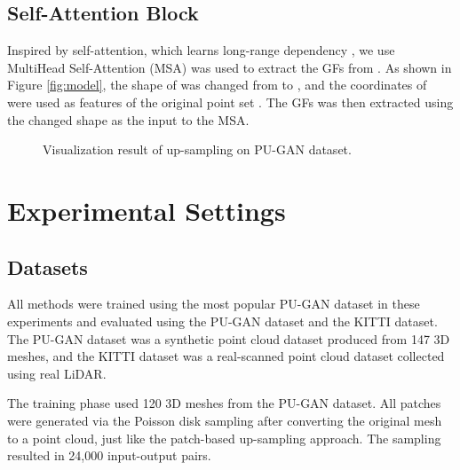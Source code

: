 \documentclass{article}
\begin{document}
\begin{center}

\end{center}

\subsection{Self-Attention Block} 
\label{sec:MHSA} 
\quad Inspired by self-attention, which learns long-range dependency \cite{vaswani2017attention}, we use MultiHead Self-Attention (MSA) was used to extract the GFs from . As shown in Figure \ref{fig:model}, the shape of  was changed from  to , and the coordinates of  were used as features of the original point set . The GFs was then extracted using the changed shape  as the input to the MSA.

\begin{figure*}[htb!]
  \centering
  \caption{Visualization result of  up-sampling on PU-GAN dataset.}
  \label{fig:x4_quality}
\end{figure*}

\section{Experimental Settings}
\label{sec:experiment_settings}

\subsection{Datasets}
\label{sec:dataset}
 \quad All methods were trained using the most popular PU-GAN \cite{li2019pu} dataset in these experiments and evaluated using the PU-GAN dataset and the KITTI \cite{geiger2013vision} dataset. The PU-GAN dataset was a synthetic point cloud dataset produced from 147 3D meshes, and the KITTI dataset was a real-scanned point cloud dataset collected using real LiDAR.
 
\quad The training phase used 120 3D meshes from the PU-GAN dataset. All patches were generated via the Poisson disk sampling after converting the original mesh to a point cloud, just like the patch-based up-sampling approach. The sampling resulted in 24,000 input-output pairs.
\end{document}
